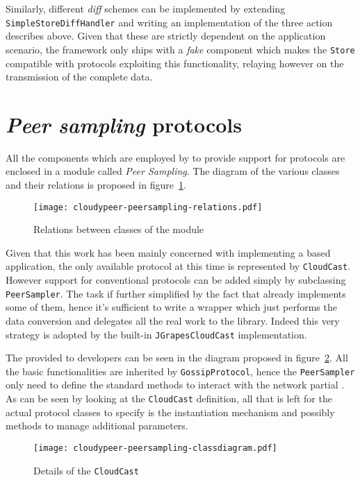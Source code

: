 Similarly, different \textit{diff} schemes can be implemented by
extending \texttt{Simple\-Store\-Diff\-Handler} and writing
an implementation of the three action describes above. Given that
these are strictly dependent on the application scenario, the
framework only ships with a \textit{fake} component which makes the
\texttt{Store} compatible with protocols exploiting this
functionality, relaying however on the transmission of the complete data.

\section{\emph{Peer sampling} protocols}
All the components which are employed by \cloudypeer to provide
support for \peersampling protocols are enclosed in a module called
\textit{Peer Sampling}. The diagram of the various classes and their
relations is proposed in figure~\ref{fig:cloudypeer-peersampling-relations}.

\begin{figure}[h!]
  \centering
  \texttt{[image: cloudypeer-peersampling-relations.pdf]}
  \caption{Relations between classes of the \peersampling module}
  \label{fig:cloudypeer-peersampling-relations}
\end{figure}

Given that this work has been mainly concerned with implementing a
\cloudcast based application, the only available protocol at this time
is represented by \texttt{CloudCast}. However support for
conventional protocols can be added simply by subclassing
\texttt{PeerSampler}. The task if further simplified by the fact that
\grapes already implements some of them, hence it's sufficient to
write a wrapper which just performs the data conversion and delegates
all the real work to the library. Indeed this very strategy is adopted
by the built-in \texttt{JGrapesCloudCast} implementation.

The \api provided to developers can be seen in the diagram proposed in
figure~\ref{fig:cloudypeer-peersampling-class}. All the basic
functionalities are inherited by \texttt{GossipProtocol}, hence the
\texttt{PeerSampler} only need to define the standard methods to
interact with the network partial \view. As can be seen by looking at
the \texttt{CloudCast} definition, all that is left for the actual
protocol classes to specify is the instantiation mechanism and
possibly methods to manage additional parameters.

\begin{figure}[h!]
  \hspace{-50pt}
  \texttt{[image: cloudypeer-peersampling-classdiagram.pdf]}
  \caption{Details of the \texttt{CloudCast} \api}
  \label{fig:cloudypeer-peersampling-class}
\end{figure}

